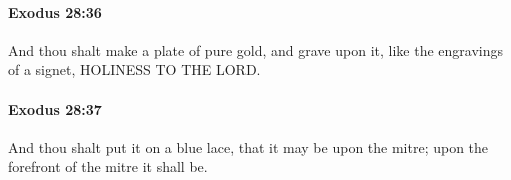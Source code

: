 		\paragraph{Exodus 28:36} %
			\label{EXODUS-28-36}

			And thou shalt make a plate of pure gold, and grave upon it, like the engravings of a signet, HOLINESS TO THE LORD.


		\paragraph{Exodus 28:37} %
			\label{EXODUS-28-37}

			And thou shalt put it on a blue lace, that it may be upon the mitre; upon the forefront of the mitre it shall be.


